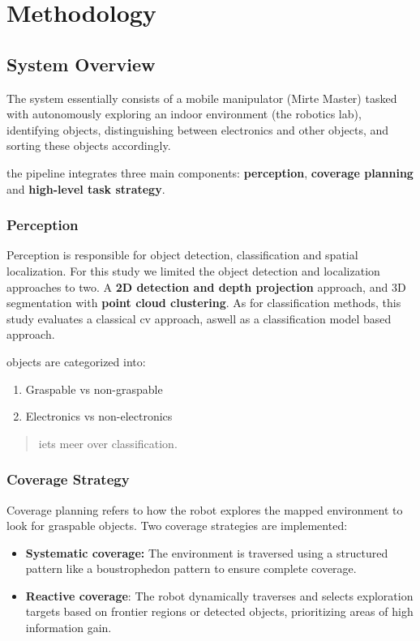 \section{Methodology}

\subsection{System Overview}

The system essentially consists of a mobile manipulator (Mirte Master) tasked with
autonomously exploring an indoor environment (the robotics lab), identifying objects, distinguishing between electronics and other objects, and sorting these objects accordingly.

the pipeline integrates three main components: \textbf{perception}, \textbf{coverage planning} and \textbf{high-level task strategy}.

\subsubsection{Perception}

Perception is responsible for object detection, classification and spatial localization. For this study we limited the object detection and localization approaches to two. A \textbf{2D detection and depth projection} approach, and 3D segmentation with \textbf{point cloud clustering}.
As for classification methods, this study evaluates a classical cv approach, aswell as a classification model based approach.

objects are categorized into:

\begin{enumerate}
\item Graspable vs non-graspable
\item Electronics vs non-electronics
\end{enumerate}

\begin{quote}
iets meer over classification.
\end{quote}

\subsubsection{Coverage Strategy}

Coverage planning refers to how the robot explores the mapped environment to look for graspable objects.
Two coverage strategies are implemented:

\begin{itemize}
\item \textbf{Systematic coverage:} The environment is traversed using a structured pattern like a  boustrophedon pattern to ensure complete coverage.
\item \textbf{Reactive coverage}: The robot dynamically traverses and selects exploration targets based on frontier regions or detected objects, prioritizing areas of high information gain.
\end{itemize}

